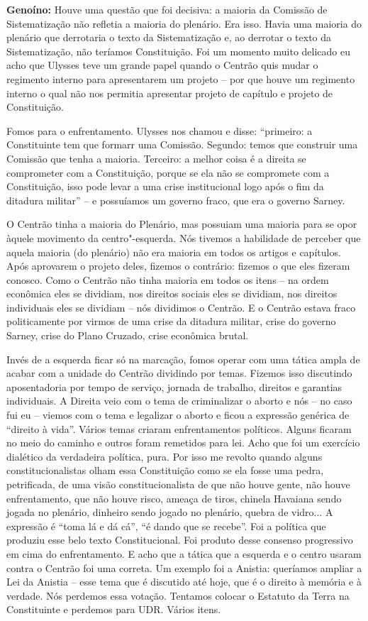 \textbf{Genoíno:} Houve uma questão que foi decisiva: a maioria da
Comissão de Sistematização não refletia a maioria do plenário. Era isso.
Havia uma maioria do plenário que derrotaria o texto da Sistematização
e, ao derrotar o texto da Sistematização, não teríamos Constituição. Foi
um momento muito delicado eu acho que Ulysses teve um grande papel
quando o Centrão quis mudar o regimento interno para apresentarem um
projeto -- por que houve um regimento interno o qual não nos permitia
apresentar projeto de capítulo e projeto de Constituição.

Fomos para o enfrentamento. Ulysses nos chamou e disse: ``primeiro: a
Constituinte tem que formarr uma Comissão. Segundo: temos que construir
uma Comissão que tenha a maioria. Terceiro: a melhor coisa é a direita
se comprometer com a Constituição, porque se ela não se compromete com a
Constituição, isso pode levar a uma crise institucional logo após o fim
da ditadura militar'' -- e possuíamos um governo fraco, que era o
governo Sarney.

O Centrão tinha a maioria do Plenário, mas possuiam uma maioria para se
opor àquele movimento da centro"-esquerda. Nós tivemos a habilidade de
perceber que aquela maioria (do plenário) não era maioria em todos os
artigos e capítulos. Após aprovarem o projeto deles, fizemos o
contrário: fizemos o que eles fizeram conosco. Como o Centrão não tinha
maioria em todos os itens -- na ordem econômica eles se dividiam, nos
direitos sociais eles se dividiam, nos direitos individuais eles se
dividiam -- nós dividimos o Centrão. E o Centrão estava fraco
politicamente por virmos de uma crise da ditadura militar, crise do
governo Sarney, crise do Plano Cruzado, crise econômica brutal.

Invés de a esquerda ficar só na marcação, fomos operar com uma tática
ampla de acabar com a unidade do Centrão dividindo por temas. Fizemos
isso discutindo aposentadoria por tempo de serviço, jornada de trabalho,
direitos e garantias individuais. A Direita veio com o tema de
criminalizar o aborto e nós -- no caso fui eu -- viemos com o tema e
legalizar o aborto e ficou a expressão genérica de ``direito à vida''.
Vários temas criaram enfrentamentos políticos. Alguns ficaram no meio do
caminho e outros foram remetidos para lei. Acho que foi um exercício
dialético da verdadeira política, pura. Por isso me revolto quando
alguns constitucionalistas olham essa Constituição como se ela fosse uma
pedra, petrificada, de uma visão constitucionalista de que não houve
gente, não houve enfrentamento, que não houve risco, ameaça de tiros,
chinela Havaiana sendo jogada no plenário, dinheiro sendo jogado no
plenário, quebra de vidro... A expressão é ``toma lá e dá cá'', ``é
dando que se recebe''. Foi a política que produziu esse belo texto
Constitucional. Foi produto desse consenso progressivo em cima do
enfrentamento. E acho que a tática que a esquerda e o centro usaram
contra o Centrão foi uma correta. Um exemplo foi a Anistia: queríamos
ampliar a Lei da Anistia -- esse tema que é discutido até hoje, que é o
direito à memória e à verdade. Nós perdemos essa votação. Tentamos
colocar o Estatuto da Terra na Constituinte e perdemos para UDR. Vários
itens.

